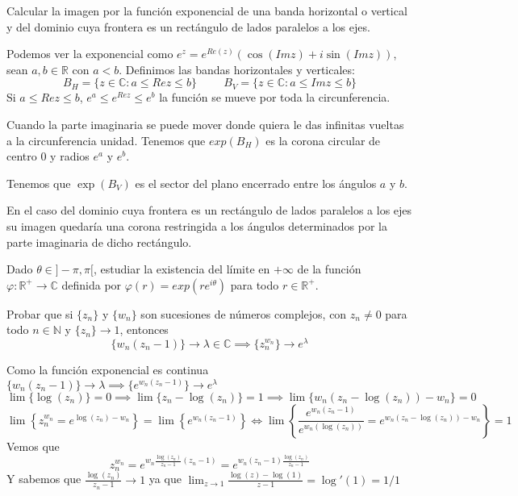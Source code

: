 \begin{ejer}
	Calcular la imagen por la función exponencial de una banda horizontal o vertical y del dominio cuya frontera es un rectángulo de lados paralelos a los ejes.
\end{ejer}

\begin{sol}
	
	Podemos ver la exponencial como $e^z = e^{Re(z)} (\cos(Imz) + i\sin(Imz))$, sean $a,b\in\mathbb{R}$ con $a<b$.
	Definimos las bandas horizontales y verticales:
	$$B_H = \{ z\in\mathbb{C} : a\leq Rez \leq b \} \hspace{1cm} B_V = \{ z\in\mathbb{C} : a\leq Imz \leq b \}$$
	Si $a\leq Rez \leq b$, $e^a \leq e^{Rez} \leq e^b$
	la función se mueve por toda la circunferencia.%
	
	Cuando la parte imaginaria se puede mover donde quiera le das infinitas vueltas a la circunferencia unidad. Tenemos que
	$exp(B_H)$ es la corona circular de centro $0$ y radios $e^a$ y $e^b$.
	
	Tenemos que $\exp(B_V)$ es el sector del plano encerrado entre los ángulos $a$ y $b$.
	
	En el caso del dominio cuya frontera es un rectángulo de lados paralelos a los ejes su imagen quedaría una corona restringida a los ángulos determinados por la parte imaginaria de dicho rectángulo.
	
	
\end{sol}


\begin{ejer}
	Dado $\theta\in]-\pi,\pi[$, estudiar la existencia del límite en $+\infty$ de la función $\varphi : \mathbb{R}^+\rightarrow\mathbb{C}$ definida por $\varphi(r) = exp(re^{i\theta})$ para todo $r\in\mathbb{R}^+$.
\end{ejer}



\begin{ejer}
	Probar que si $\{z_n\}$ y $\{w_n\}$ son sucesiones de números complejos, con $z_n \not = 0$ para todo
	$n\in \mathbb{N}$ y $\{ z_n \} \rightarrow 1$, entonces
	$$ \{w_n(z_n-1)\} \rightarrow \lambda\in\mathbb{C} \implies \{ z_n^{w_n} \}\rightarrow e^{\lambda} $$
\end{ejer}

\begin{sol}
	
	Como la función exponencial es continua
	$\{ w_n (z_n-1) \} \rightarrow \lambda \implies \{ e^{w_n(z_n-1)} \} \rightarrow e^{\lambda}$
	$$\lim \{ \log(z_n) \} = 0 \implies \lim \{ z_n-\log(z_n) \} = 1 \implies \lim \{ w_n(z_n-\log(z_n))-w_n \} = 0$$
	$$\lim \left\{ z_n^{w_n} = e^{\log(z_n)-w_n} \right\}= \lim \left\{ e^{w_n (z_n-1)} \right\} \Longleftrightarrow \lim\left\{ \frac{e^{w_n(z_n-1)}}{e^{w_n (\log(z_n))}} = e^{w_n (z_n-\log(z_n))-w_n} \right\} = 1$$
	Vemos que
	$$z_n^{w_n} = e^{w_n \frac{\log(z_n)}{z_n-1} (z_n-1)} =  e^{w_n (z_n-1) \frac{\log(z_n)}{z_n-1}}$$
	Y sabemos que $ \frac{\log(z_n)}{z_n-1} \rightarrow 1$ ya que
	$\lim_{z\rightarrow 1} \frac{\log(z)-\log(1)}{z-1} = \log'(1) = 1/1$
	
\end{sol}




